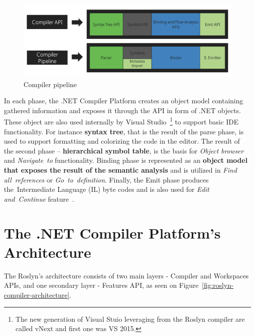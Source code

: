 \documentclass[
  digital, %
  table,   %
  lof,     %
  lot,     %
  oneside,
]{fithesis3}
\begin{document}
\begin{figure}[h!]
		\centering
			\includegraphics[scale=0.5]{img/roslyn-compiler-pipeline}
		\caption{Compiler pipeline~\cite{roslyn-overview}}
		\label{fig:roslyn-compiler-pipeline}
\end{figure}

In each phase, the .NET Compiler Platform creates an object model containing gathered information and exposes it through the API in form of .NET objects. These object are also used internally by Visual Studio~\footnote{The new generation of Visual Stuio leveraging from the Roslyn compiler are called vNext and first one was VS 2015.} to support basic IDE functionality. For instance \textbf{syntax tree}, that is the result of the parse phase, is used to support formatting and colorizing the code in the editor. The result of the second phase -- \textbf{hierarchical symbol table}, is the basis for \textit{Object browser} and \textit{Navigate~to} functionality. Binding phase is represented as an \textbf{object model that exposes the result of the semantic analysis} and is utilized in \textit{Find all~references} or \textit{Go~to~definition}. Finally, the Emit phase produces the~Intermediate Language (IL) byte codes and is also used for \textit{Edit and~Continue} feature~\cite{roslyn-overview}.

\section{The .NET Compiler Platform's Architecture}
The Roslyn's architecture consists of two main layers - Compiler and Workspaces APIs, and one secondary layer - Features API, as seen on Figure~\ref{fig:roslyn-compiler-architecture}.
\end{document}
